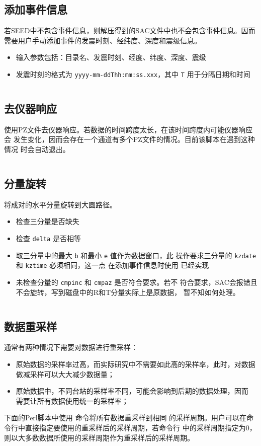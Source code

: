 \subsection{添加事件信息}
\label{subsec:event-info-perl}
若SEED中不包含事件信息，则解压得到的SAC文件中也不会包含事件信息。因而
需要用户手动添加事件的发震时刻、经纬度、深度和震级信息。
\begin{itemize}
\item 输入参数包括：目录名、发震时刻、经度、纬度、深度、震级
\item 发震时刻的格式为 \texttt{yyyy-mm-ddThh:mm:ss.xxx}，其中 \texttt{T}
    用于分隔日期和时间
\end{itemize}
\inputminted{perl}{./call-in-script/4.eventinfo.pl}

\subsection{去仪器响应}
\label{subsec:transfer-perl}
使用PZ文件去仪器响应。若数据的时间跨度太长，在该时间跨度内可能仪器响应会
发生变化，因而会存在一个通道有多个PZ文件的情况。目前该脚本在遇到这种情况
时会自动退出。
\inputminted{perl}{./call-in-script/5.transfer.pl}

\subsection{分量旋转}
\label{subsec:rotate-perl}
将成对的水平分量旋转到大圆路径。
\begin{itemize}
\item 检查三分量是否缺失
\item 检查 \texttt{delta} 是否相等
\item 取三分量中的最大 \texttt{b} 和最小 \texttt{e} 值作为数据窗口，此
    操作要求三分量的 \texttt{kzdate} 和 \texttt{kztime} 必须相同，这一点
    在添加事件信息时使用  已经实现
\item 未检查分量的 \texttt{cmpinc} 和 \texttt{cmpaz} 是否符合要求。若不
    符合要求，SAC会报错且不会旋转，写到磁盘中的R和T分量实际上是原数据，
    暂不知如何处理。
\end{itemize}
\inputminted{perl}{./call-in-script/6.rotate.pl}

\subsection{数据重采样}
\label{subsec:resample-perl}
通常有两种情况下需要对数据进行重采样：
\begin{itemize}
\item 原始数据的采样率过高，而实际研究中不需要如此高的采样率，此时，对数据
    做减采样可以大大减少数据量；
\item 原始数据中，不同台站的采样率不同，可能会影响到后期的数据处理，因而
    需要让所有数据使用统一的采样率；
\end{itemize}
下面的Perl脚本中使用  命令将所有数据重采样到相同
的采样周期。用户可以在命令行中直接指定要使用的重采样后的采样周期，若命令行
中的采样周期指定为0，则以大多数数据所使用的采样周期作为重采样后的采样周期。
\inputminted{perl}{./call-in-script/7.resample.pl}
